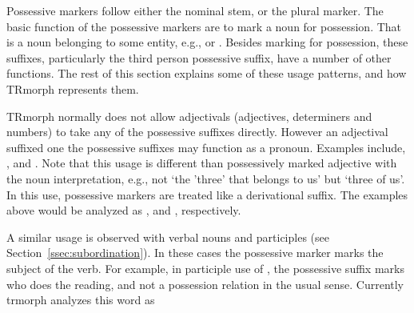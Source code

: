 \documentclass[twocolumn]{article}
\begin{document}
Possessive markers follow either the nominal stem, or the plural marker. 
The basic function of the possessive markers are to mark a noun for possession.
That is a noun belonging to some entity, e.g.,  or .
Besides marking for possession, 
these suffixes, particularly the third person possessive suffix, 
have a number of other functions. 
The rest of this section explains some of these usage patterns, 
and how TRmorph represents them.

TRmorph normally does not allow adjectivals (adjectives, determiners and numbers) to take any of the possessive suffixes directly.
However an adjectival suffixed one the possessive suffixes may function as a pronoun. 
Examples include, 
, 
 and
.
Note that this usage is different than possessively marked adjective 
with the noun interpretation, 
e.g., not `the 'three' that belongs to us' but `three of us'.
In this use, possessive markers are treated like a derivational suffix.
The examples above would be analyzed as 
,
 and
,
respectively.


A similar usage is observed with verbal nouns and participles (see Section~\ref{ssec:subordination}).
In these cases the possessive marker marks the subject of the verb.
For example, in participle use of 
,
the possessive suffix marks who does the reading, 
and not a possession relation in the usual sense.
Currently trmorph analyzes this word as
\end{document}
